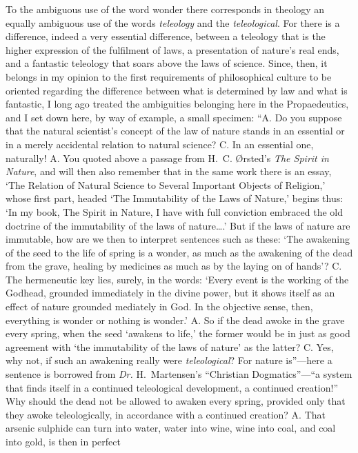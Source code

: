 \documentclass[12pt,a4paper]{article}
\newcommand{\opage}[1]{\marginnote{\footnotesize\textit{[#1]}}}
\begin{document}
To the ambiguous use of the word wonder there corresponds in
theology an equally ambiguous use of the words \emph{teleology} and
the \emph{teleological}. For there is a difference, indeed a very
essential difference, between a teleology that is the higher
expression of the fulfilment of laws, a presentation of nature's
real ends, and a fantastic teleology that soars above the laws of
science. Since, then, it belongs in my opinion to the first
requirements of philosophical culture to
\opage{4}be oriented regarding the difference between what is determined by
law and what is fantastic, I long ago treated the ambiguities
belonging here in the Propaedeutics, and I set down here, by way of
example, a small specimen: ``A. Do you suppose that the natural
scientist's concept of the law of nature stands in an essential or
in a merely accidental relation to natural science? C. In an
essential one, naturally! A. You quoted above a passage from
H.~C. Ørsted's \emph{The Spirit in Nature}, and will then also
remember that in the same work there is an essay, `The Relation of
Natural Science to Several Important Objects of Religion,' whose
first part, headed `The Immutability of the Laws of Nature,' begins
thus: `In my book, The Spirit in Nature, I have with full conviction
embraced the old doctrine of the immutability of the laws of
nature\ldots.' But if the laws of nature are immutable, how are we
then to interpret sentences such as these: `The awakening of the
seed to the life of spring is a wonder, as much as the awakening of
the dead from the grave, healing by medicines as much as by the
laying on of hands'? C. The hermeneutic key lies, surely, in the
words: `Every event is the working of the Godhead, grounded
immediately in the divine power, but it shows itself as an effect
of nature grounded mediately in God. In the objective sense, then,
everything is wonder or nothing is wonder.' A. So if the dead
awoke in the grave every spring, when the seed `awakens to life,'
the former would be in just as good agreement with `the
immutability of the laws of nature' as the latter? C. Yes, why not,
if such an awakening really were \emph{teleological}? For nature
is''---here a sentence is borrowed from \textit{Dr.} H.~Martensen's
``Christian Dogmatics''---``a system that finds itself in a
continued teleological development, a continued creation!'' Why
should the dead not be allowed to awaken every spring, provided
only that they awoke teleologically, in accordance with a continued
creation? A. That arsenic sulphide can turn into water, water into
wine, wine into coal, and coal into gold, is then in perfect
\end{document}
